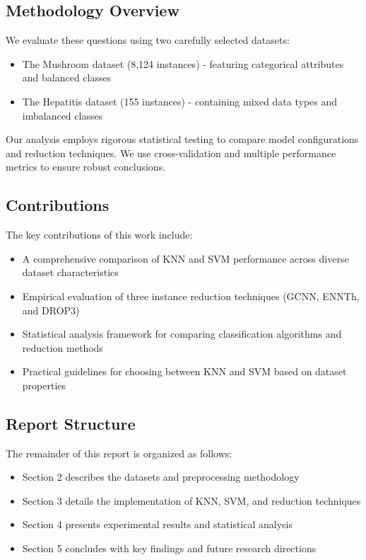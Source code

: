 \subsection{Methodology Overview}

We evaluate these questions using two carefully selected datasets:
\begin{itemize}
    \item The Mushroom dataset (8,124 instances) - featuring categorical attributes and balanced classes
    \item The Hepatitis dataset (155 instances) - containing mixed data types and imbalanced classes
\end{itemize}

Our analysis employs rigorous statistical testing to compare model configurations and reduction techniques. We use cross-validation and multiple performance metrics to ensure robust conclusions.

\subsection{Contributions}

The key contributions of this work include:
\begin{itemize}
    \item A comprehensive comparison of KNN and SVM performance across diverse dataset characteristics
    \item Empirical evaluation of three instance reduction techniques (GCNN, ENNTh, and DROP3)
    \item Statistical analysis framework for comparing classification algorithms and reduction methods
    \item Practical guidelines for choosing between KNN and SVM based on dataset properties
\end{itemize}

\subsection{Report Structure}

The remainder of this report is organized as follows:
\begin{itemize}
    \item Section 2 describes the datasets and preprocessing methodology
    \item Section 3 details the implementation of KNN, SVM, and reduction techniques
    \item Section 4 presents experimental results and statistical analysis
    \item Section 5 concludes with key findings and future research directions
\end{itemize}